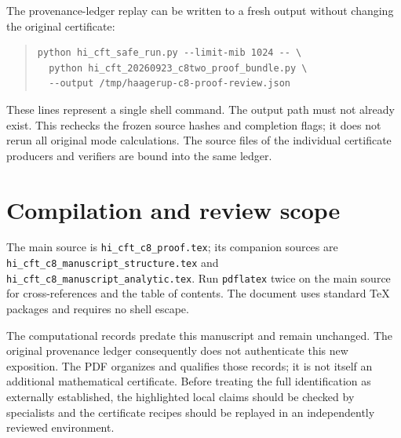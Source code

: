 \documentclass[11pt,a4paper]{article}
\theoremstyle{definition}
\newcommand{\artifact}[1]{\textnormal{\nolinkurl{#1}}}
\begin{document}
The provenance-ledger replay can be written to a fresh output without
changing the original certificate:
\begin{quote}\small
\begin{verbatim}
python hi_cft_safe_run.py --limit-mib 1024 -- \
  python hi_cft_20260923_c8two_proof_bundle.py \
  --output /tmp/haagerup-c8-proof-review.json
\end{verbatim}
\end{quote}
These lines represent a single shell command. The output path must not
already exist. This rechecks the frozen source hashes and completion
flags; it does not rerun all original mode calculations. The source
files of the individual certificate producers and verifiers are bound
into the same ledger.

\section{Compilation and review scope}\label{sec:compilation}
The main source is \artifact{hi_cft_c8_proof.tex}; its companion sources
are \artifact{hi_cft_c8_manuscript_structure.tex} and
\artifact{hi_cft_c8_manuscript_analytic.tex}. Run \texttt{pdflatex} twice
on the main source for cross-references and the table of contents.
The document uses standard TeX packages and requires no shell escape.

The computational records predate this manuscript and remain unchanged.
The original provenance ledger consequently does not authenticate this
new exposition. The PDF organizes and qualifies those records; it is not
itself an additional mathematical certificate. Before treating the full
identification as externally established, the highlighted local claims
should be checked by specialists and the certificate recipes should be
replayed in an independently reviewed environment.
\end{document}
